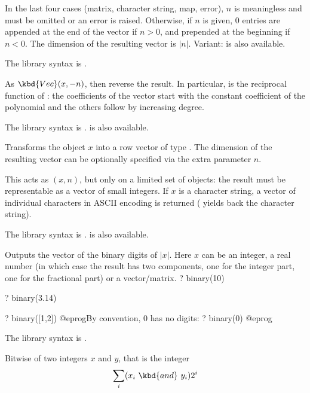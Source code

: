 In the last four cases (matrix, character string, map, error), $n$ is
meaningless and must be omitted or an error is raised. Otherwise, if $n$ is
given, $0$ entries are appended at the end of the vector if $n > 0$, and
prepended at the beginning if $n < 0$. The dimension of the resulting vector
is $|n|$. Variant:  is also available.

The library syntax is .

\label{se:Vecrev}
As $\kbd{Vec}(x, -n)$, then reverse the result. In particular,
 is the reciprocal function of : the
coefficients of the vector start with the constant coefficient of the
polynomial and the others follow by increasing degree.

The library syntax is .
 is also available.

\label{se:Vecsmall}
Transforms the object $x$ into a row vector of type . The
dimension of the resulting vector can be optionally specified via the extra
parameter $n$.

This acts as $(x,n)$, but only on a limited set of objects:
the result must be representable as a vector of small integers.
If $x$ is a character string, a vector of individual characters in ASCII
encoding is returned ( yields back the character string).

The library syntax is .
 is also available.

\label{se:binary}
Outputs the vector of the binary digits of $|x|$. Here $x$ can be an
integer, a real number (in which case the result has two components, one for
the integer part, one for the fractional part) or a vector/matrix.
\bprog
? binary(10)

? binary(3.14)

? binary([1,2])
@eprog\noindent By convention, $0$ has no digits:
\bprog
? binary(0)
@eprog

The library syntax is .

\label{se:bitand}
Bitwise 
of two integers $x$ and $y$, that is the integer
$$\sum_i (x_i~\kbd{and}~y_i) 2^i$$

